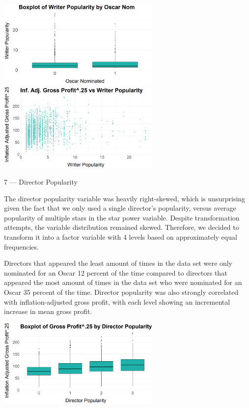 \documentclass[10pt]{article}
\begin{document}
\begin{center}
\includegraphics[width=8cm]{_assets/_eda/writer_pop_on.png}
\hspace{1cm}
\includegraphics[width=8cm]{_assets/_eda/writer_pop_iagp.png}
\end{center}

7 --- Director Popularity

The director popularity variable was heavily right-skewed, which is unsurprising given the fact that we only used a single director’s popularity, versus average popularity of multiple stars in the star power variable. Despite transformation attempts, the variable distribution remained skewed. Therefore, we decided to transform it into a factor variable with 4 levels based on approximately equal frequencies.

Directors that appeared the least amount of times in the data set were only nominated for an Oscar 12 percent of the time compared to directors that appeared the most amount of times in the data set who were nominated for an Oscar 35 percent of the time. Director popularity was also strongly correlated with inflation-adjusted gross profit, with each level showing an incremental increase in mean gross profit.

\begin{center}
\includegraphics[width=8cm]{_assets/_eda/dir_pop_iagp_bp.png}

\end{center}
\end{document}
